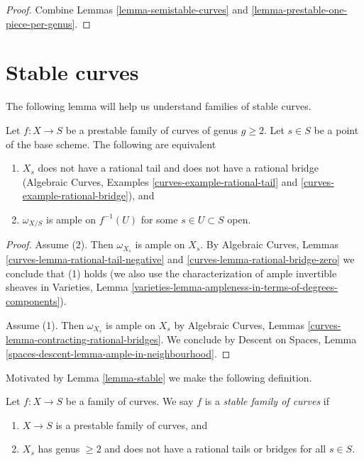\begin{proof}
Combine Lemmas \ref{lemma-semistable-curves} and
\ref{lemma-prestable-one-piece-per-genus}.
\end{proof}







\section{Stable curves}
\label{section-stable-curves}

\noindent
The following lemma will help us understand families of stable curves.

\begin{lemma}
\label{lemma-stable}
Let $f : X \to S$ be a prestable family of curves of genus $g \geq 2$.
Let $s \in S$ be a point of the base scheme.
The following are equivalent
\begin{enumerate}
\item $X_s$ does not have a rational tail and does not have a
rational bridge
(Algebraic Curves, Examples
\ref{curves-example-rational-tail} and
\ref{curves-example-rational-bridge}), and
\item $\omega_{X/S}$ is ample on $f^{-1}(U)$ for some $s \in U \subset S$ open.
\end{enumerate}
\end{lemma}

\begin{proof}
Assume (2). Then $\omega_{X_s}$ is ample on $X_s$.
By Algebraic Curves, Lemmas \ref{curves-lemma-rational-tail-negative} and
\ref{curves-lemma-rational-bridge-zero}
we conclude that (1) holds (we also
use the characterization of ample invertible sheaves
in Varieties, Lemma
\ref{varieties-lemma-ampleness-in-terms-of-degrees-components}).

\medskip\noindent
Assume (1). Then $\omega_{X_s}$ is ample on $X_s$ by
Algebraic Curves, Lemmas \ref{curves-lemma-contracting-rational-bridges}.
We conclude by Descent on Spaces, Lemma
\ref{spaces-descent-lemma-ample-in-neighbourhood}.
\end{proof}

\noindent
Motivated by Lemma \ref{lemma-stable} we make the following definition.

\begin{definition}
\label{definition-stable}
Let $f : X \to S$ be a family of curves.
We say $f$ is a {\it stable family of curves} if
\begin{enumerate}
\item $X \to S$ is a prestable family of curves, and
\item $X_s$ has genus $\geq 2$ and does not have a rational tails
or bridges for all $s \in S$.
\end{enumerate}
\end{definition}

